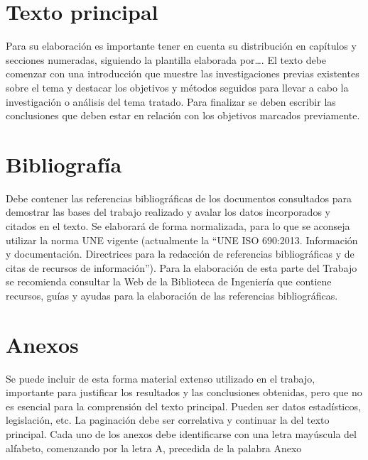 \section{Texto principal}
Para su elaboración es importante tener en cuenta su distribución en capítulos y secciones numeradas, siguiendo la plantilla elaborada por…. 
El texto debe comenzar con una introducción que muestre las investigaciones previas existentes sobre el tema y destacar los objetivos y métodos seguidos para llevar a cabo la investigación o análisis del tema tratado.
Para finalizar se deben escribir las conclusiones que deben estar en relación con los objetivos marcados previamente.
\section{Bibliografía}
Debe contener las referencias bibliográficas de los documentos consultados para demostrar las bases del trabajo realizado y avalar los datos incorporados y citados en el texto.
Se elaborará de forma normalizada, para lo que se aconseja utilizar la norma UNE vigente (actualmente la “UNE ISO 690:2013. Información y documentación. Directrices para la redacción de referencias bibliográficas y de citas de recursos de información”).
Para la elaboración de esta parte del Trabajo se recomienda consultar la Web de la Biblioteca de Ingeniería que contiene recursos, guías y ayudas para la elaboración de las referencias bibliográficas. 
\section{Anexos}
Se puede incluir de esta forma material extenso utilizado en el trabajo, importante para justificar los resultados y las conclusiones obtenidas, pero que no es esencial para la comprensión del texto principal. Pueden ser datos estadísticos, legislación, etc.
La paginación debe ser correlativa y continuar la del texto principal. Cada uno de los anexos debe identificarse con una letra mayúscula del alfabeto, comenzando por la letra A, precedida de la palabra Anexo

\endinput
